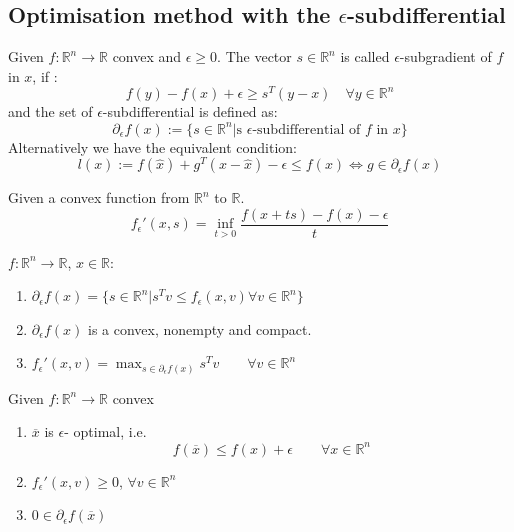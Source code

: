 \subsection{Optimisation method with the $\epsilon$-subdifferential}

\begin{definition}
	Given $f :\mathbb{R}^n \rightarrow \mathbb{R}$ convex and $\epsilon \geq 0$. The vector $s \in \mathbb{R}^n$ is called $\epsilon$-subgradient of $f$ in $x$, if :
	\begin{equation*}
		f(y) - f(x) + \epsilon \geq s^T(y-x) \quad \forall y \in \mathbb{R}^n
	\end{equation*}
	and the set of $\epsilon$-subdifferential is defined as:
	\begin{equation*}
		\partial_\epsilon f(x):=  \{ s \in \mathbb{R}^n | \text{s  $\epsilon$-subdifferential of $f$ in $x$} \}
	\end{equation*}
	Alternatively we have the equivalent condition:
	\begin{equation*}
		l(x) := f(\hat{x}) + g^T( x - \hat{x})- \epsilon \leq f(x) \Leftrightarrow g \in \partial_\epsilon f(x)
	\end{equation*}
\end{definition}



\begin{definition}
Given a convex function from $\mathbb{R}^n$ to $\mathbb{R}$. 
\begin{equation*}
	f_\epsilon'(x, s) = \inf_{t > 0} \frac{f(x + ts) - f(x) - \epsilon}{t}
\end{equation*}
\end{definition}



\begin{theorem}
	$f: \mathbb{R}^n \rightarrow \mathbb{R}$, $x \in \mathbb{R}$:
\begin{enumerate}
	\item $\partial_\epsilon f(x) = \{ s \in \mathbb{R}^n | s^T v  \leq f_\epsilon(x, v) \forall v \in \mathbb{R}^n\}$
	\item $\partial_\epsilon f(x)$ is a convex, nonempty and compact.
	\item $f_\epsilon'(x, v) = \max_{s \in \partial_\epsilon f(x)} s^T v \qquad \forall v \in \mathbb{R}^n$
\end{enumerate}
\end{theorem}

\begin{theorem}
Given $f: \mathbb{R}^n \rightarrow \mathbb{R}$ convex 
\begin{enumerate}
	\item $\overline{x}$ is $\epsilon$- optimal, i.e.
	\begin{equation*}
		f(\overline{x}) \leq f(x) + \epsilon \qquad \forall x \in \mathbb{R}^n
	\end{equation*}
	\item $f_\epsilon'(x, v) \geq 0$, $\forall v \in \mathbb{R}^n$
	\item $0 \in \partial_\epsilon f(\overline{x})$
\end{enumerate}
\end{theorem}

